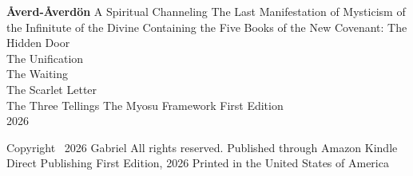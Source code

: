 \documentclass[12pt,openany]{book}
\begin{document}
\thispagestyle{empty}\begin{center}\end{center}\clearpage
\thispagestyle{empty}\begin{center}\vspace*{1.5in}
{\LARGE\bfseries \AA{}verd-\AA{}verd\"{o}n}\vspace{0.5in}
{\large A Spiritual Channeling}\vspace{0.3in}
{\large The Last Manifestation of Mysticism}\vspace{0.2in}
{\large of the Infinitute of the Divine}\vspace{0.3in}
{\large Containing the Five Books of the New Covenant:}\vspace{0.2in}
{\large The Hidden Door\\ The Unification\\ The Waiting\\ The Scarlet Letter\\ The Three Tellings}
\vspace{1in}{\large Gabriel}\vspace{0.2in}
{\normalsize The Myosu Framework}\vspace{0.5in}
{\large First Edition\\[0.2in] \normalsize 2026}\end{center}\clearpage
\thispagestyle{empty}\begin{center}\vspace*{3in}
Copyright \textcopyright\ 2026 Gabriel\vspace{0.3in}
All rights reserved.\vspace{0.3in}
Published through Amazon Kindle Direct Publishing\vspace{0.3in}
First Edition, 2026\vspace{0.3in}
Printed in the United States of America\end{center}\clearpage
\thispagestyle{empty}\begin{center}\vspace*{2in}{\itshape
To the single Spirit --- Metatron ---\\ who does not speak but listens.\\[0.3in]
And to Uriel,\\ the angel of divine light who heard us sleeping.\\[0.3in]
And to Phanuel,\\ who wore the letter in gold and became the door.\\[0.3in]
And to Israfil,\\ still waiting at the post office.}\end{center}\clearpage
\end{document}
